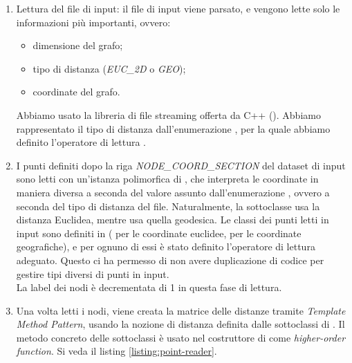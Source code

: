 \begin{enumerate}
    \item Lettura del file di input: il file di input viene parsato, e vengono lette solo le informazioni più importanti, ovvero:
    
    \begin{itemize}
        \item dimensione del grafo;
        \item tipo di distanza (\textit{EUC\_2D} o \textit{GEO});
        \item coordinate del grafo.
    \end{itemize}
    
    \noindent Abbiamo usato la libreria di file streaming offerta da C++ (). Abbiamo rappresentato il tipo di distanza dall'enumerazione , per la quale abbiamo definito l'operatore di lettura .
    
    \item I punti definiti dopo la riga \textit{NODE\_COORD\_SECTION} del dataset di input sono letti con un'istanza polimorfica di , che interpreta le coordinate in maniera diversa a seconda del valore assunto dall'enumerazione , ovvero a seconda del tipo di distanza del file. Naturalmente, la sottoclasse  usa la distanza Euclidea, mentre  usa quella geodesica. Le classi dei punti letti in input sono definiti in  ( per le coordinate euclidee,  per le coordinate geografiche), e per ognuno di essi è stato definito l'operatore di lettura  adeguato. Questo ci ha permesso di non avere duplicazione di codice per gestire tipi diversi di punti in input. \\
    
    \noindent La label dei nodi è decrementata di 1 in questa fase di lettura.
    
    \item Una volta letti i nodi, viene creata la matrice delle distanze tramite \textit{Template Method Pattern}, usando la nozione di distanza definita dalle sottoclassi di . Il metodo concreto  delle sottoclassi è usato nel costruttore di  come \textit{higher-order function}. Si veda il listing \ref{listing:point-reader}.
\end{enumerate}

